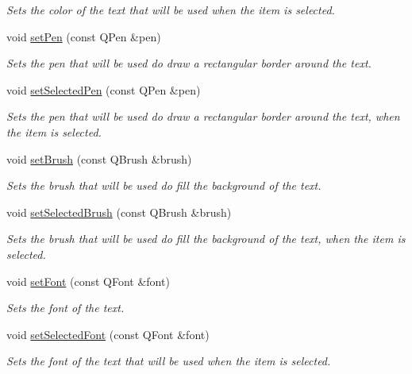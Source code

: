 \begin{DoxyCompactItemize}
\begin{DoxyCompactList}\small\item\em Sets the color of the text that will be used when the item is selected. \end{DoxyCompactList}\item 
void \hyperlink{classQCPItemText_a9b9ec6eea0eb0603977ff84d4c78d0a3}{set\+Pen} (const Q\+Pen \&pen)
\begin{DoxyCompactList}\small\item\em Sets the pen that will be used do draw a rectangular border around the text. \end{DoxyCompactList}\item 
void \hyperlink{classQCPItemText_a291febe586f0da3f1c392e77bef4aa20}{set\+Selected\+Pen} (const Q\+Pen \&pen)
\begin{DoxyCompactList}\small\item\em Sets the pen that will be used do draw a rectangular border around the text, when the item is selected. \end{DoxyCompactList}\item 
void \hyperlink{classQCPItemText_a1c7e131516df2ed8d941ef31240ded8e}{set\+Brush} (const Q\+Brush \&brush)
\begin{DoxyCompactList}\small\item\em Sets the brush that will be used do fill the background of the text. \end{DoxyCompactList}\item 
void \hyperlink{classQCPItemText_a6b8377eeb2af75eb9528422671ac16cb}{set\+Selected\+Brush} (const Q\+Brush \&brush)
\begin{DoxyCompactList}\small\item\em Sets the brush that will be used do fill the background of the text, when the item is selected. \end{DoxyCompactList}\item 
void \hyperlink{classQCPItemText_a94ad60ebe04f5c07c35e7c2029e96b1f}{set\+Font} (const Q\+Font \&font)
\begin{DoxyCompactList}\small\item\em Sets the font of the text. \end{DoxyCompactList}\item 
void \hyperlink{classQCPItemText_a0be2841772f83663c4db307928b82816}{set\+Selected\+Font} (const Q\+Font \&font)
\begin{DoxyCompactList}\small\item\em Sets the font of the text that will be used when the item is selected. \end{DoxyCompactList}\item 

\end{DoxyCompactItemize}
